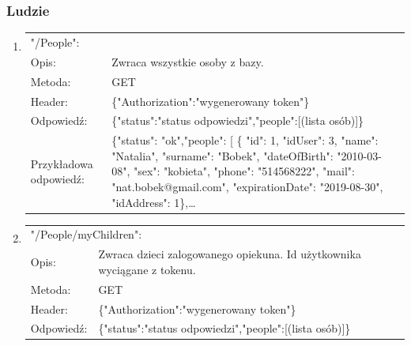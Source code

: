 \documentclass[12pt, titlepage]{article}
\begin{document}
\subsubsection{Ludzie}

\begin{enumerate}

	\item
	{\renewcommand{\arraystretch}{1.5}
	\begin{tabular}[t]{p{3cm} p{15cm}}
	\multicolumn{2}{l}{"/People":} \\
	Opis: &  Zwraca wszystkie osoby z bazy.\\
	Metoda: & GET \\
	Header: & \{"Authorization":"wygenerowany token"\} \\
	Odpowiedź: & \{"status":"status odpowiedzi",\newline "people":[(lista osób)]\} \\
	Przykładowa \newline odpowiedź: & 			\{"status": "ok",\newline "people": [\newline
        \{
            "id": 1,\newline
            "idUser": 3,\newline
            "name": "Natalia",\newline
            "surname": "Bobek",\newline
            "dateOfBirth": "2010-03-08",\newline
            "sex": "kobieta",\newline
            "phone": "514568222",\newline
            "mail": "nat.bobek@gmail.com",\newline
            "expirationDate": "2019-08-30",\newline
            "idAddress": 1\},\newline \ldots
	\end{tabular}}
	
	\item
	{\renewcommand{\arraystretch}{1.5}
	\begin{tabular}[t]{p{3cm} p{15cm}}
	\multicolumn{2}{l}{"/People/myChildren":} \\
	Opis: &  Zwraca dzieci zalogowanego opiekuna. \newline Id użytkownika wyciągane z tokenu. \\
	Metoda: & GET \\
	Header: & \{"Authorization":"wygenerowany token"\} \\
	Odpowiedź: & \{"status":"status odpowiedzi",\newline "people":[(lista osób)]\}
	\end{tabular}}
	

\end{enumerate}
\end{document}
